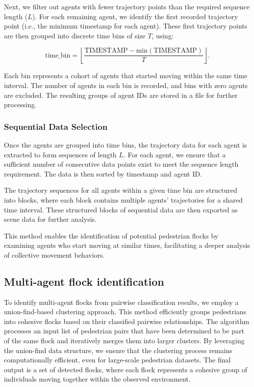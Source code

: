 \documentclass{article}
\begin{document}
Next, we filter out agents with fewer trajectory points than the required sequence length ($L$). For each remaining agent, we identify the first recorded trajectory point (i.e., the minimum timestamp for each agent). These first trajectory points are then grouped into discrete time bins of size $T$, using:

\begin{equation}
\text{time\_bin} = \left\lfloor \frac{\text{TIMESTAMP} - \text{min}(\text{TIMESTAMP})}{T} \right\rfloor.
\end{equation}

Each bin represents a cohort of agents that started moving within the same time interval. The number of agents in each bin is recorded, and bins with zero agents are excluded. The resulting groups of agent IDs are stored in a file for further processing.

\subsubsection{Sequential Data Selection}
Once the agents are grouped into time bins, the trajectory data for each agent is extracted to form sequences of length $L$. For each agent, we ensure that a sufficient number of consecutive data points exist to meet the sequence length requirement. The data is then sorted by timestamp and agent ID.

The trajectory sequences for all agents within a given time bin are structured into blocks, where each block contains multiple agents' trajectories for a shared time interval. These structured blocks of sequential data are then exported as scene data for further analysis.


This method enables the identification of potential pedestrian flocks by examining agents who start moving at similar times, facilitating a deeper analysis of collective movement behaviors.


\subsection{Multi-agent flock identification}\label{multi-agent}

To identify multi-agent flocks from pairwise classification results, we employ a union-find-based clustering approach. This method efficiently groups pedestrians into cohesive flocks based on their classified pairwise relationships. The algorithm processes an input list of pedestrian pairs that have been determined to be part of the same flock and iteratively merges them into larger clusters. By leveraging the union-find data structure, we ensure that the clustering process remains computationally efficient, even for large-scale pedestrian datasets. The final output is a set of detected flocks, where each flock represents a cohesive group of individuals moving together within the observed environment.
\end{document}
